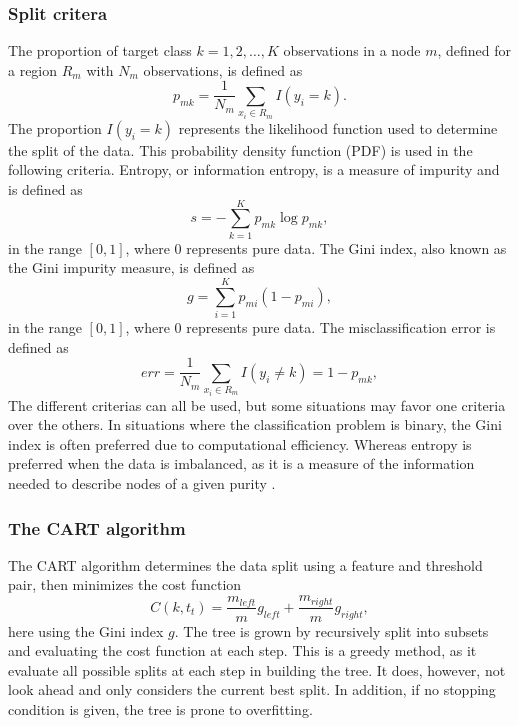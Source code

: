 \subsubsection{Split critera}\label{sssec:splitting_criteria}
The proportion of target class $k = 1, 2, \dots, K$ observations in a node $m$, defined for a region $R_{m}$ with $N_{m}$ observations, is defined as
\begin{equation}\label{eq:pdf_tree}
    p_{mk} = \frac{1}{N_{m}} \sum_{x_{i} \in R_{m}} I(y_{i} = k) .
\end{equation}
The proportion $I(y_{i} = k)$ represents the likelihood function used to determine the split of the data. This probability density function (PDF) is used in the following criteria. Entropy, or information entropy, is a measure of impurity and is defined as
\begin{equation}\label{eq:entropy}
    s = - \sum_{k=1}^{K} p_{mk} \log p_{mk} ,
\end{equation}
in the range $[0, 1]$, where $0$ represents pure data. The Gini index, also known as the Gini impurity measure, is defined as 
\begin{equation}\label{eq:gini_index}
    g = \sum_{i=1}^{K} p_{mi}(1 - p_{mi}) ,
\end{equation}
in the range $[0, 1]$, where $0$ represents pure data. The misclassification error is defined as
\begin{equation}\label{eq:misc_error}
    err = \frac{1}{N_{m}} \sum_{x_{i} \in R_{m}} I(y_{i} \neq k) = 1 - p_{mk},
\end{equation}
The different criterias can all be used, but some situations may favor one criteria over the others. In situations where the classification problem is binary, the Gini index is often preferred due to computational efficiency. Whereas entropy is preferred when the data is imbalanced, as it is a measure of the information needed to describe nodes of a given purity \cite[p. 309]{hastie:2009:elements}.

\subsubsection{The CART algorithm}\label{sssec:cart_algorithm}
The CART algorithm determines the data split using a feature and threshold pair, then minimizes the cost function
\begin{equation}\label{eq:cost_cart}
    C(k, t_{t}) = \frac{m_{left}}{m} g_{left} + \frac{m_{right}}{m} g_{right} , 
\end{equation}
here using the Gini index $g$. The tree is grown by recursively split into subsets and evaluating the cost function at each step. This is a greedy method, as it evaluate all possible splits at each step in building the tree. It does, however, not look ahead and only considers the current best split. In addition, if no stopping condition is given, the tree is prone to overfitting. 

